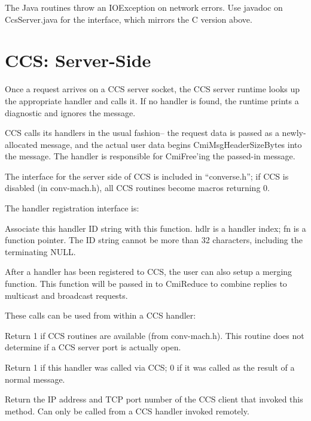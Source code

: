 The Java routines throw an IOException on network errors.
Use javadoc on CcsServer.java for the interface, which mirrors
the C version above.


\section{CCS: Server-Side}

Once a request arrives on a CCS server socket, the CCS server 
runtime looks up the appropriate handler and calls it.
If no handler is found, the runtime prints a diagnostic
and ignores the message.

CCS calls its handlers in the usual \converse{} fashion--
the request data is passed as a newly-allocated message,
and the actual user data begins CmiMsgHeaderSizeBytes
into the message.  The handler is responsible for CmiFree'ing
the passed-in message.

The interface for the server side of CCS is included in 
``converse.h''; if CCS is disabled (in conv-mach.h), all
CCS routines become macros returning 0.

The handler registration interface is:

Associate this handler ID string with this function.  
hdlr is a \converse{} handler index; fn is a function pointer.
The ID string cannot be more than 32 characters, including the
terminating NULL.

After a handler has been registered to CCS, the user can also setup a merging
function. This function will be passed in to CmiReduce to combine replies to
multicast and broadcast requests.


These calls can be used from within a CCS handler:

Return 1 if CCS routines are available (from conv-mach.h).
This routine does not determine if a CCS server port is 
actually open.

Return 1 if this handler was called via CCS; 0 if it was
called as the result of a normal \converse{} message.

Return the IP address and TCP port number
of the CCS client that invoked this method.
Can only be called from a CCS handler invoked remotely.

